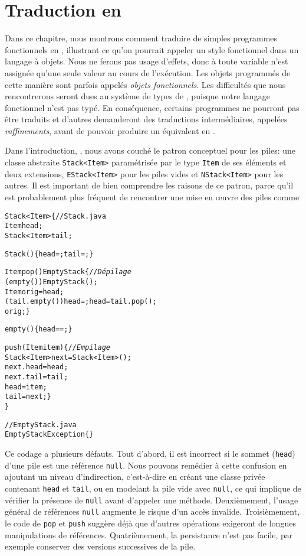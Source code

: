 \chapter{Traduction en \Java}

Dans ce chapitre, nous montrons comment traduire de simples programmes
fonctionnels en \Java, illustrant ce qu'on pourrait appeler un style
fonctionnel dans un langage à objets. Nous ne ferons pas usage
d'effets, donc à toute variable n'est assignée qu'une seule valeur au
cours de l'exécution. Les objets programmés de cette manière sont
parfois appelés \emph{objets fonctionnels}. Les difficultés que nous
rencontrerons seront dues au système de types de \Java, puisque notre
langage fonctionnel n'est pas typé. En conséquence, certains
programmes ne pourront pas être traduits et d'autres demanderont des
traductions intermédiaires, appelées \emph{raffinements}, avant de
pouvoir produire un équivalent en \Java.

Dans l'introduction, , nous avons couché le patron
conceptuel pour les piles: une classe abstraite \texttt{Stack<Item>}
paramétrisée par le type \texttt{Item} de ses éléments et deux
extensions, \texttt{EStack<Item>} pour les piles vides et
\texttt{NStack<Item>} pour les autres. Il est important de bien
comprendre les raisons de ce patron, parce qu'il est probablement plus
fréquent de rencontrer une mise en œuvre des piles comme
\begin{alltt}
\public \class Stack<Item> \{\hfill// Stack.java
  \private Item head;
  \private Stack<Item> tail;

  \public Stack() \{ head = \nullX; tail = \nullX; \}

  \public Item pop() \throws EmptyStack \{\hfill// \emph{Dépilage}
    \ifX (empty()) \throw \new EmptyStack();
    \final Item orig = head;
    \ifX (tail.empty()) head = \nullX; \elseX head = tail.pop();
    \return orig; \}

  \public \booleanX empty() \{ \return head == \nullX; \}

  \public \void push(\final Item item) \{\hfill// \emph{Empilage}
    Stack<Item> next = \new Stack<Item>();
    next.head = head;
    next.tail = tail;
    head = item;
    tail = next; \}
\}

// EmptyStack.java
\public \class EmptyStack \extends Exception \{\}
\end{alltt}
Ce codage a plusieurs défauts. Tout d'abord, il est incorrect si le
sommet (\texttt{head}) d'une pile est une référence
\texttt{null}. Nous pouvons remédier à cette confusion en ajoutant un
niveau d'indirection, c'est-à-dire en créant une classe privée
contenant \texttt{head} et \texttt{tail}, ou en modelant la pile vide
avec \texttt{null}, ce qui implique de vérifier la présence de
\texttt{null} avant d'appeler une méthode. Deuxièmement, l'usage
général de références \texttt{null} augmente le risque d'un accès
invalide. Troisièmement, le code de \texttt{pop} et \texttt{push}
suggère déjà que d'autres opérations exigeront de longues
manipulations de références. Quatrièmement, la persistance n'est pas
facile, par exemple conserver des versions successives de la pile.

